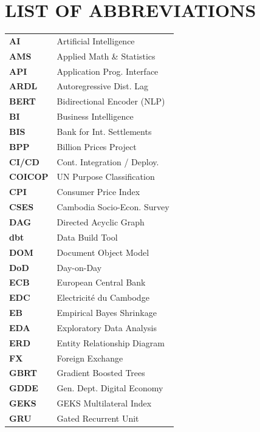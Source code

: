 \chapter*{\centering LIST OF ABBREVIATIONS}

\vspace{-0.2cm}
\noindent
\begin{minipage}[t]{0.48\textwidth}
\small
\begin{tabular}{@{} >{\bfseries}l @{\hspace{0.35cm}} l @{}}
AI       & Artificial Intelligence \\
AMS      & Applied Math \& Statistics \\
API      & Application Prog. Interface \\
ARDL     & Autoregressive Dist. Lag \\
BERT     & Bidirectional Encoder (NLP) \\
BI       & Business Intelligence \\
BIS      & Bank for Int. Settlements \\
BPP      & Billion Prices Project \\
CI/CD    & Cont. Integration / Deploy. \\
COICOP   & UN Purpose Classification \\
CPI      & Consumer Price Index \\
CSES     & Cambodia Socio-Econ. Survey \\
DAG      & Directed Acyclic Graph \\
dbt      & Data Build Tool \\
DOM      & Document Object Model \\
DoD      & Day-on-Day \\
ECB      & European Central Bank \\
EDC      & Electricit\'e du Cambodge \\
EB       & Empirical Bayes Shrinkage \\
EDA      & Exploratory Data Analysis \\
ERD      & Entity Relationship Diagram \\
FX       & Foreign Exchange \\
GBRT     & Gradient Boosted Trees \\
GDDE     & Gen. Dept. Digital Economy \\
GEKS     & GEKS Multilateral Index \\
GRU      & Gated Recurrent Unit \\

\end{tabular}
\end{minipage}
